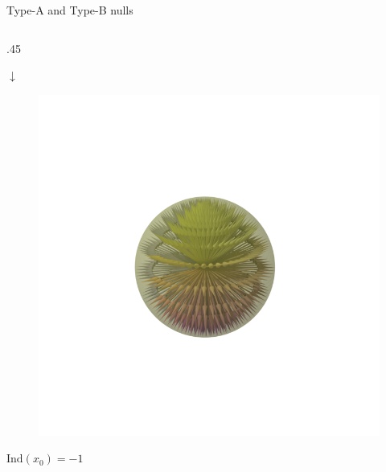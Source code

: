 \documentclass[final]{beamer}
\newlength{\onecolwid}
\newlength{\twocolwid}
\begin{document}
\begin{frame}[t]
\begin{columns}[t]
\begin{column}{\twocolwid}
\begin{columns}[t,totalwidth=\twocolwid]
\begin{column}{\onecolwid}
\begin{block}{Type-A and Type-B nulls}
\begin{columns}[t,totalwidth=\onecolwid]
\begin{column}{.45\onecolwid}
\begin{centering}
\begin{figure}
        \end{figure}
        $\downarrow$
        \begin{figure}
        \includegraphics[width=.45\onecolwid]{fig/negindex_end.png}
        \end{figure}
        $\mathrm{Ind}(x_0)=-1 $
        \end{centering}
    \end{column}


\end{columns}
\end{block}
\end{column}
\end{columns}
\end{column}
\end{columns}
\end{frame}
\end{document}
